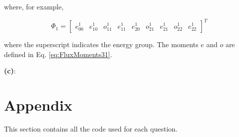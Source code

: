 \documentclass[10pt]{article}
\begin{document}
where, for example,

\begin{equation}
\Phi_1=\begin{bmatrix}
e_{00}^1 & e_{10}^1 & o_{11}^1 & e_{11}^1 & e_{20}^1 & o_{21}^1 & e_{21}^1 & o_{22}^1 & e_{22}^1
\end{bmatrix}^T
\end{equation}

where the superscript indicates the energy group. The moments \(e\) and \(o\) are defined in Eq. \eqref{eq:FluxMoments31}.\newline

\textbf{(c)}: 

\section{Appendix}
This section contains all the code used for each question. 
\begin{comment}
\subsection{Question 3, parts (a) and (b)}

\end{comment}
\end{document}

